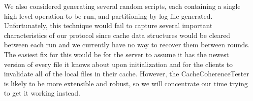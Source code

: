 \documentclass[11pt]{article}
\begin{document}
We also considered generating several random scripts, each containing a single high-level operation to be run, and partitioning by log-file generated. Unfortunately, this technique
would fail to capture several important characteristics of our protocol since cache data structures would be cleared between each run and we currently have no way to recover them between rounds.
The easiest fix for this would be for the server to assume it has the newest version of every file it knows about upon initialization and for the clients to invalidate all of the local files in their cache.
However, the CacheCoherenceTester is likely to be more extensible and robust, so we will concentrate our time trying to get it working instead. \\
\end{document}
